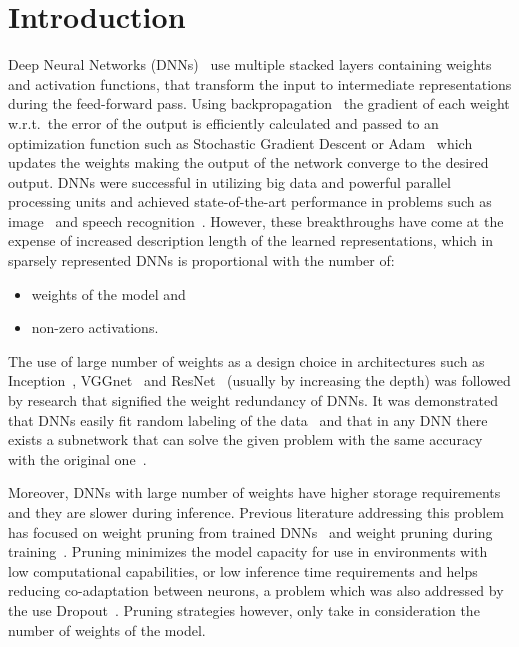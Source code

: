 \documentclass[journal]{IEEEtran}
\begin{document}
\section{Introduction}
Deep Neural Networks (DNNs)~\cite{lecun2015deep} use multiple stacked layers containing weights and activation functions, that transform the input to intermediate representations during the feed-forward pass.
Using backpropagation~\cite{rumelhart1986learning} the gradient of each weight w.r.t.\ the error of the output is efficiently calculated and passed to an optimization function such as Stochastic Gradient Descent or Adam~\cite{kingma2014adam} which updates the weights making the output of the network converge to the desired output.
DNNs were successful in utilizing big data and powerful parallel processing units and achieved state-of-the-art performance in problems such as image~\cite{krizhevsky2012imagenet} and speech recognition~\cite{graves2013speech}.
However, these breakthroughs have come at the expense of increased description length of the learned representations, which in sparsely represented DNNs is proportional with the number of:
\begin{itemize}
  \item weights of the model and
  \item non-zero activations.
\end{itemize}

The use of large number of weights as a design choice in architectures such as Inception~\cite{szegedy2016rethinking}, VGGnet~\cite{simonyan2014very} and ResNet~\cite{he2016deep} (usually by increasing the depth) was followed by research that signified the weight redundancy of DNNs.
It was demonstrated that DNNs easily fit random labeling of the data~\cite{zhang2016understanding} and that in any DNN there exists a subnetwork that can solve the given problem with the same accuracy with the original one~\cite{frankle2018lottery}.

Moreover, DNNs with large number of weights have higher storage requirements and they are slower during inference.
Previous literature addressing this problem has focused on weight pruning from trained DNNs~\cite{aghasi2017net} and weight pruning during training~\cite{lin2017runtime}.
Pruning minimizes the model capacity for use in environments with low computational capabilities, or low inference time requirements and helps reducing co-adaptation between neurons, a problem which was also addressed by the use Dropout~\cite{srivastava2014dropout}.
Pruning strategies however, only take in consideration the number of weights of the model.
\end{document}
